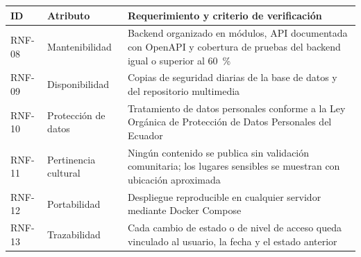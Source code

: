 {\centering\singlespacing
  \label{tab:rnf2}
  \begin{tabular}{|p{}|p{}|p{}|}
    \hline
    \textbf{ID} & \textbf{Atributo} & \textbf{Requerimiento y criterio de verificación} \tabularnewline
    \hline
    \raggedright\hspace{0pt}RNF-08 & \raggedright\hspace{0pt}Mantenibilidad & \raggedright\hspace{0pt}Backend organizado en módulos, API documentada con OpenAPI y cobertura de pruebas del backend igual o superior al 60~\% \tabularnewline
    \hline
    \raggedright\hspace{0pt}RNF-09 & \raggedright\hspace{0pt}Disponibilidad & \raggedright\hspace{0pt}Copias de seguridad diarias de la base de datos y del repositorio multimedia \tabularnewline
    \hline
    \raggedright\hspace{0pt}RNF-10 & \raggedright\hspace{0pt}Protección de datos & \raggedright\hspace{0pt}Tratamiento de datos personales conforme a la Ley Orgánica de Protección de Datos Personales del Ecuador \tabularnewline
    \hline
    \raggedright\hspace{0pt}RNF-11 & \raggedright\hspace{0pt}Pertinencia cultural & \raggedright\hspace{0pt}Ningún contenido se publica sin validación comunitaria; los lugares sensibles se muestran con ubicación aproximada \tabularnewline
    \hline
    \raggedright\hspace{0pt}RNF-12 & \raggedright\hspace{0pt}Portabilidad & \raggedright\hspace{0pt}Despliegue reproducible en cualquier servidor mediante Docker Compose \tabularnewline
    \hline
    \raggedright\hspace{0pt}RNF-13 & \raggedright\hspace{0pt}Trazabilidad & \raggedright\hspace{0pt}Cada cambio de estado o de nivel de acceso queda vinculado al usuario, la fecha y el estado anterior \tabularnewline
    \hline
  \end{tabular}\par}

